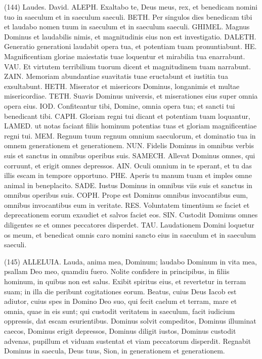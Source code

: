 \begin{biblechapter}  (144) 
\verse  Laudes. David. ALEPH. Exaltabo te, Deus meus, rex, et benedicam nomini tuo in saeculum et in saeculum saeculi. 
\verse BETH. Per singulos dies benedicam tibi et laudabo nomen tuum in saeculum et in saeculum saeculi. 
\verse GHIMEL. Magnus Dominus et laudabilis nimis, et magnitudinis eius non est investigatio. 
\verse DALETH. Generatio generationi laudabit opera tua, et potentiam tuam pronuntiabunt. 
\verse HE. Magnificentiam gloriae maiestatis tuae loquentur et mirabilia tua enarrabunt. 
\verse VAU. Et virtutem terribilium tuorum dicent et magnitudinem tuam narrabunt. 
\verse ZAIN. Memoriam abundantiae suavitatis tuae eructabunt et iustitia tua exsultabunt. 
\verse HETH. Miserator et misericors Dominus, longanimis et multae misericordiae. 
\verse TETH. Suavis Dominus universis, et miserationes eius super omnia opera eius. 
\verse IOD. Confiteantur tibi, Domine, omnia opera tua; et sancti tui benedicant tibi. 
\verse CAPH. Gloriam regni tui dicant et potentiam tuam loquantur, 
\verse LAMED. ut notas faciant filiis hominum potentias tuas et gloriam magnificentiae regni tui. 
\verse MEM. Regnum tuum regnum omnium saeculorum, et dominatio tua in omnem generationem et generationem. NUN. Fidelis Dominus in omnibus verbis suis et sanctus in omnibus operibus suis. 
\verse SAMECH. Allevat Dominus omnes, qui corruunt, et erigit omnes depressos. 
\verse AIN. Oculi omnium in te sperant, et tu das illis escam in tempore opportuno. 
\verse PHE. Aperis tu manum tuam et imples omne animal in beneplacito. 
\verse SADE. Iustus Dominus in omnibus viis suis et sanctus in omnibus operibus suis. 
\verse COPH. Prope est Dominus omnibus invocantibus eum, omnibus invocantibus eum in veritate. 
\verse RES. Voluntatem timentium se faciet et deprecationem eorum exaudiet et salvos faciet eos. 
\verse SIN. Custodit Dominus omnes diligentes se et omnes peccatores disperdet. 
\verse TAU. Laudationem Domini loquetur os meum, et benedicat omnis caro nomini sancto eius in saeculum et in saeculum saeculi. 
\end{biblechapter}

\begin{biblechapter}  (145) 
\verse ALLELUIA. Lauda, anima mea, Dominum; 
\verse laudabo Dominum in vita mea, psallam Deo meo, quamdiu fuero. 
\verse Nolite confidere in principibus, in filiis hominum, in quibus non est salus. 
\verse Exibit spiritus eius, et revertetur in terram suam; in illa die peribunt cogitationes eorum. 
\verse Beatus, cuius Deus Iacob est adiutor, cuius spes in Domino Deo suo, 
\verse qui fecit caelum et terram, mare et omnia, quae in eis sunt; qui custodit veritatem in saeculum, 
\verse facit iudicium oppressis, dat escam esurientibus. Dominus solvit compeditos, 
\verse Dominus illuminat caecos, Dominus erigit depressos, Dominus diligit iustos, 
\verse Dominus custodit advenas, pupillum et viduam sustentat et viam peccatorum disperdit. 
\verse Regnabit Dominus in saecula, Deus tuus, Sion, in generationem et generationem. 
\end{biblechapter}

